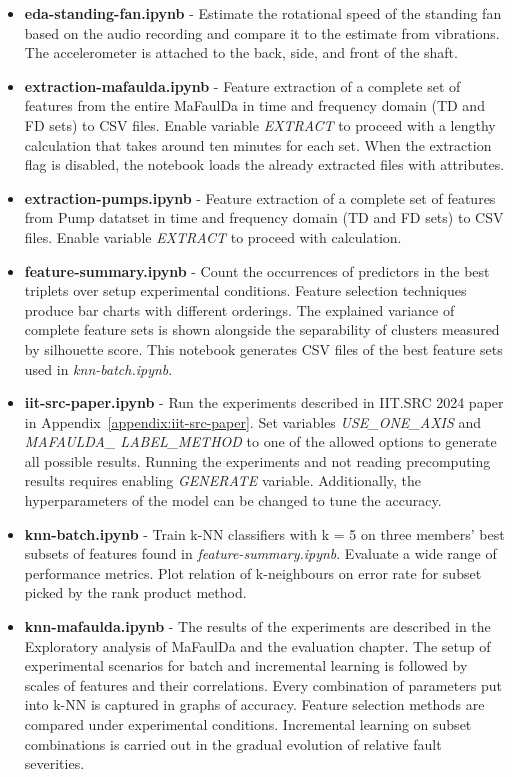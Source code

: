 \begin{itemize}[noitemsep]
\item \textbf{eda-standing-fan.ipynb} - Estimate the rotational speed of the standing fan based on the audio recording and compare it to the estimate from vibrations. The accelerometer is attached to the back, side, and front of the shaft.

\item \textbf{extraction-mafaulda.ipynb} - Feature extraction of a complete set of features from the entire MaFaulDa in time and frequency domain (TD and FD sets) to CSV files. Enable variable \emph{EXTRACT} to proceed with a lengthy calculation that takes around ten minutes for each set. When the extraction flag is disabled, the notebook loads the already extracted files with attributes.

\item \textbf{extraction-pumps.ipynb} - Feature extraction of a complete set of features from Pump datatset in time and frequency domain (TD and FD sets) to CSV files. Enable variable \emph{EXTRACT} to proceed with calculation.

\item \textbf{feature-summary.ipynb} - Count the occurrences of predictors in the best triplets over setup experimental conditions. Feature selection techniques produce bar charts with different orderings. The explained variance of complete feature sets is shown alongside the separability of clusters measured by silhouette score. This notebook generates CSV files of the best feature sets used in \emph{knn-batch.ipynb}.

\item \textbf{iit-src-paper.ipynb} - Run the experiments described in IIT.SRC 2024 paper in Appendix~\ref{appendix:iit-src-paper}. Set variables \emph{USE\_ONE\_AXIS} and \emph{MAFAULDA\_ LABEL\_METHOD} to one of the allowed options to generate all possible results. Running the experiments and not reading precomputing results requires enabling \emph{GENERATE} variable. Additionally, the hyperparameters of the model can be changed to tune the accuracy.

\item \textbf{knn-batch.ipynb} - Train k-NN classifiers with k = 5 on three members' best subsets of features found in \emph{feature-summary.ipynb}. Evaluate a wide range of performance metrics. Plot relation of k-neighbours on error rate for subset picked by the rank product method.

\item \textbf{knn-mafaulda.ipynb} - The results of the experiments are described in the Exploratory analysis of MaFaulDa and the evaluation chapter. The setup of experimental scenarios for batch and incremental learning is followed by scales of features and their correlations. Every combination of parameters put into k-NN is captured in graphs of accuracy. Feature selection methods are compared under experimental conditions. Incremental learning on subset combinations is carried out in the gradual evolution of relative fault severities.


\end{itemize}
